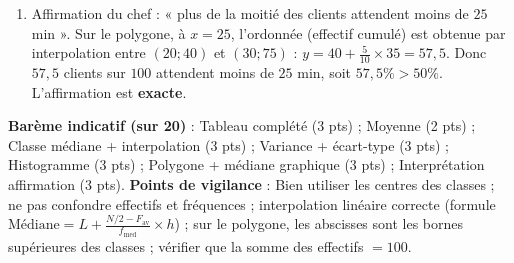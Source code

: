 \documentclass[11pt]{article}
\begin{document}
\begin{corrige}
\begin{enumerate}
\begin{enumerate}
\item Médiane graphique : abscisse du point d'ordonnée $50$ sur le polygone. Entre $(20;40)$ et $(30;75)$, on trouve $x \approx 22,9$ min, cohérent avec le calcul.
\end{enumerate}
\item Affirmation du chef : « plus de la moitié des clients attendent moins de $25$ min ». Sur le polygone, à $x=25$, l'ordonnée (effectif cumulé) est obtenue par interpolation entre $(20;40)$ et $(30;75)$ : $y = 40 + \frac{5}{10}\times35 = 57,5$. Donc $57,5$ clients sur $100$ attendent moins de $25$ min, soit $57,5\% > 50\%$. L'affirmation est \textbf{exacte}.
\end{enumerate}

\textbf{Barème indicatif (sur 20)} : Tableau complété (3 pts) ; Moyenne (2 pts) ; Classe médiane + interpolation (3 pts) ; Variance + écart-type (3 pts) ; Histogramme (3 pts) ; Polygone + médiane graphique (3 pts) ; Interprétation affirmation (3 pts).
\textbf{Points de vigilance} : Bien utiliser les centres des classes ; ne pas confondre effectifs et fréquences ; interpolation linéaire correcte (formule $\text{Médiane}=L+\frac{N/2-F_{\text{av}}}{f_{\text{med}}}\times h$) ; sur le polygone, les abscisses sont les bornes supérieures des classes ; vérifier que la somme des effectifs $=100$.
\end{corrige}
\end{document}
